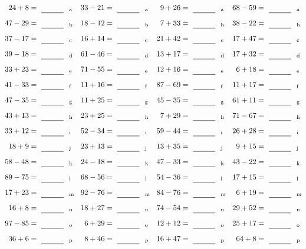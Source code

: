 \documentclass
[
  draft    = true,
  fontsize = 11pt,
  parskip  = half-
]
{scrartcl}
\begin{document}
\clearpage
\begin{align*}
    \pline{24+8}&=\rline{a}
  & \pline{33-21}&=\rline{a}
  & \pline{9+26}&=\rline{a}
  & \pline{68-59}&=\rline{a} \\[1ex]
    \pline{47-29}&=\rline{b}
  & \pline{18-12}&=\rline{b}
  & \pline{7+33}&=\rline{b}
  & \pline{38-22}&=\rline{b} \\[1ex]
    \pline{37-17}&=\rline{c}
  & \pline{16+14}&=\rline{c}
  & \pline{21+42}&=\rline{c}
  & \pline{17+47}&=\rline{c} \\[1ex]
    \pline{39-18}&=\rline{d}
  & \pline{61-46}&=\rline{d}
  & \pline{13+17}&=\rline{d}
  & \pline{17+32}&=\rline{d} \\[1ex]
    \pline{33+23}&=\rline{e}
  & \pline{71-55}&=\rline{e}
  & \pline{12+16}&=\rline{e}
  & \pline{6+18}&=\rline{e} \\[1ex]
    \pline{41-33}&=\rline{f}
  & \pline{11+16}&=\rline{f}
  & \pline{87-69}&=\rline{f}
  & \pline{11+17}&=\rline{f} \\[1ex]
    \pline{47-35}&=\rline{g}
  & \pline{11+25}&=\rline{g}
  & \pline{45-35}&=\rline{g}
  & \pline{61+11}&=\rline{g} \\[1ex]
    \pline{43+13}&=\rline{h}
  & \pline{23+25}&=\rline{h}
  & \pline{7+29}&=\rline{h}
  & \pline{71-67}&=\rline{h} \\[1ex]
    \pline{33+12}&=\rline{i}
  & \pline{52-34}&=\rline{i}
  & \pline{59-44}&=\rline{i}
  & \pline{26+28}&=\rline{i} \\[1ex]
    \pline{18+9}&=\rline{j}
  & \pline{23+13}&=\rline{j}
  & \pline{13+35}&=\rline{j}
  & \pline{9+15}&=\rline{j} \\[1ex]
    \pline{58-48}&=\rline{k}
  & \pline{24-18}&=\rline{k}
  & \pline{47-33}&=\rline{k}
  & \pline{43-22}&=\rline{k} \\[1ex]
    \pline{89-75}&=\rline{l}
  & \pline{68-56}&=\rline{l}
  & \pline{54-36}&=\rline{l}
  & \pline{17+15}&=\rline{l} \\[1ex]
    \pline{17+23}&=\rline{m}
  & \pline{92-76}&=\rline{m}
  & \pline{84-76}&=\rline{m}
  & \pline{6+19}&=\rline{m} \\[1ex]
    \pline{16+8}&=\rline{n}
  & \pline{18+27}&=\rline{n}
  & \pline{74-54}&=\rline{n}
  & \pline{29+52}&=\rline{n} \\[1ex]
    \pline{97-85}&=\rline{o}
  & \pline{6+29}&=\rline{o}
  & \pline{12+12}&=\rline{o}
  & \pline{25+17}&=\rline{o} \\[1ex]
    \pline{36+6}&=\rline{p}
  & \pline{8+46}&=\rline{p}
  & \pline{16+47}&=\rline{p}
  & \pline{64+8}&=\rline{p}
\end{align*}
\end{document}
